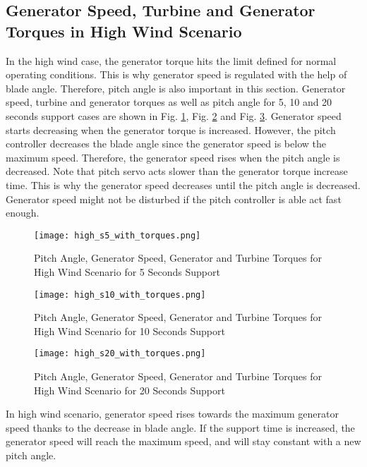 \subsection{Generator Speed, Turbine and Generator Torques in High Wind Scenario}
In the high wind case, the generator torque hits the limit defined for normal operating conditions. This is why generator speed is regulated with the help of blade angle. Therefore, pitch angle is also important in this section. Generator speed, turbine and generator torques as well as pitch angle for 5, 10 and 20 seconds support cases are shown in Fig. \ref{high_s5}, Fig. \ref{high_s10} and Fig. \ref{high_s20}. Generator speed starts decreasing when the generator torque is increased. However, the pitch controller decreases the blade angle since the generator speed is below the maximum speed. Therefore, the generator speed rises when the pitch angle is decreased. Note that pitch servo acts slower than the generator torque increase time. This is why the generator speed decreases until the pitch angle is decreased. Generator speed might not be disturbed if the pitch controller is able act fast enough.\par
\begin{figure}[h!]
	\centering
	\texttt{[image: high\_s5\_with\_torques.png]}
	\caption{Pitch Angle, Generator Speed, Generator and Turbine Torques for High Wind Scenario for 5 Seconds Support}
	\label{high_s5}
\end{figure}
\begin{figure}[h!]
	\centering
	\texttt{[image: high\_s10\_with\_torques.png]}
	\caption{Pitch Angle, Generator Speed, Generator and Turbine Torques for High Wind Scenario for 10 Seconds Support}
	\label{high_s10}
\end{figure}
\begin{figure}[h!]
	\centering
	\texttt{[image: high\_s20\_with\_torques.png]}
	\caption{Pitch Angle, Generator Speed, Generator and Turbine Torques for High Wind Scenario for 20 Seconds Support}
	\label{high_s20}
\end{figure}
In high wind scenario, generator speed rises towards the maximum generator speed thanks to the decrease in blade angle. If the support time is increased, the generator speed will reach the maximum speed, and will stay constant with a new pitch angle. 
